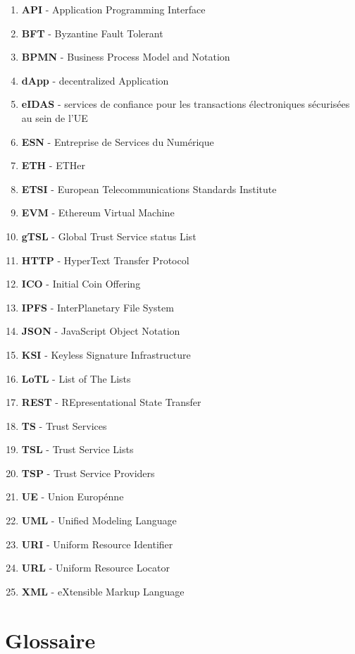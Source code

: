 \documentclass{tnreport}
\begin{document}
\begin{enumerate}
	\item \textbf{API} - Application Programming Interface
	\item \textbf{BFT} - Byzantine Fault Tolerant
	\item \textbf{BPMN} - Business Process Model and Notation
	\item \textbf{dApp} - decentralized Application
	\item \textbf{eIDAS} - services de confiance pour les transactions électroniques sécurisées au sein de l'UE
	\item \textbf{ESN} - Entreprise de Services du Numérique
	\item \textbf{ETH} - ETHer
	\item \textbf{ETSI} - European Telecommunications Standards Institute
	\item \textbf{EVM} - Ethereum Virtual Machine
	\item \textbf{gTSL} - Global Trust Service status List
	\item \textbf{HTTP} - HyperText Transfer Protocol 
	\item \textbf{ICO} - Initial Coin Offering
	\item \textbf{IPFS} - InterPlanetary File System
	\item \textbf{JSON} - JavaScript Object Notation
	\item \textbf{KSI} - Keyless Signature Infrastructure
	\item \textbf{LoTL} - List of The Lists
	\item \textbf{REST} - REpresentational State Transfer
	\item \textbf{TS} - Trust Services
	\item \textbf{TSL} - Trust Service Lists
	\item \textbf{TSP} - Trust Service Providers
	\item \textbf{UE} - Union Europénne
	\item \textbf{UML} - Unified Modeling Language
	\item \textbf{URI} - Uniform Resource Identifier
	\item \textbf{URL} - Uniform Resource Locator
	\item \textbf{XML} - eXtensible Markup Language
\end{enumerate}

\chapter*{Glossaire}
\end{document}
